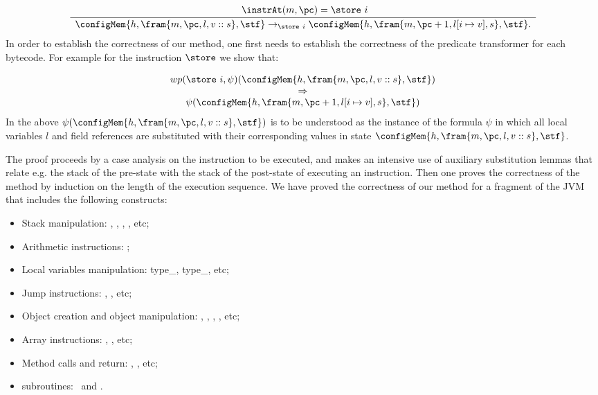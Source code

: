 $$\frac{\begin{array}[c]{c}
\ \instrAt (m,\pc)=\store \ i
\end{array}}%
{\begin{array}[t]{c}
\configMem{h,\fram{m,\pc,l,v::s},\stf} \to_{\store\ i}
\configMem{h,\fram{m,\pc+1,l[i \mapsto v],s},\stf}.
\end{array}}$$
In order to establish the correctness of our method, one first needs
to establish the correctness of the predicate transformer for each
bytecode. For example for the instruction $\store$ we show that:

$$\begin{array}[t]{c} 
wp(\store \ i , \psi )( \configMem{h,\fram{m,\pc,l,v::s},\stf} ) \\ 
\Rightarrow  
\\
\psi( \configMem{h,\fram{m,\pc+1,l[i \mapsto v],s},\stf})
\end{array}$$
In the above $\psi(\configMem{h,\fram{m,\pc,l,v::s},\stf} )$ is to be
understood as the instance of the formula $\psi$ in which all local
variables $l$ and field references are substituted with their
corresponding values in state $\configMem{h,\fram{m,\pc,l,v::s},\stf} $.


The proof proceeds by a case analysis on the instruction to be
executed, and makes an intensive use of auxiliary substitution
lemmas that relate e.g. the stack of the pre-state with the stack
of the post-state of executing an instruction. Then one proves the
correctness of the method by induction on the length of the
execution sequence. We have proved the correctness of our method
for a fragment of the JVM that includes the following constructs:
\begin{itemize}
\item Stack manipulation: \push, \pop, \dup, , \swap etc;
\item Arithmetic instructions: \arithOp;
\item Local variables manipulation: type\_\load, type\_\store, etc;
\item Jump instructions: \ifCond, \goto, etc;
\item Object creation and  object manipulation: \new, \putfield, \getfield, \newarray, etc;
\item Array instructions: \arrstore, \arrload, etc;
\item Method calls and return: \invoke, \return, etc;
\item subroutines: \jsr\ and \ret.
\end{itemize}


